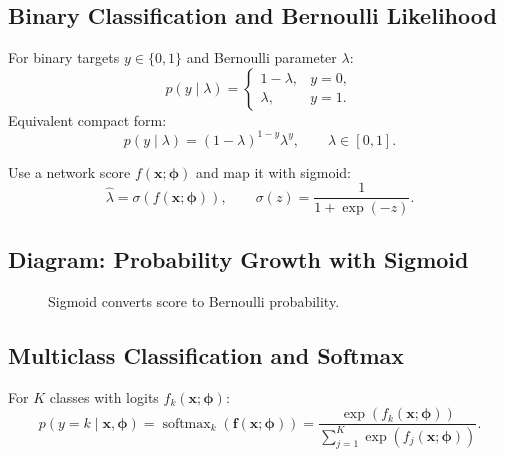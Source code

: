 \subsection{Binary Classification and Bernoulli Likelihood}
For binary targets $y\in\{0,1\}$ and Bernoulli parameter $\lambda$:
\[
p(y\mid \lambda)=
\begin{cases}
1-\lambda, & y=0,\\
\lambda, & y=1.
\end{cases}
\]
Equivalent compact form:
\[
p(y\mid\lambda)=(1-\lambda)^{1-y}\lambda^{y},
\qquad
\lambda\in[0,1].
\]

Use a network score $f(\mathbf{x};\boldsymbol{\phi})$ and map it with sigmoid:
\[
\hat{\lambda}=\sigma(f(\mathbf{x};\boldsymbol{\phi})),
\qquad
\sigma(z)=\frac{1}{1+\exp(-z)}.
\]

\subsection{Diagram: Probability Growth with Sigmoid}
\begin{figure}[h!]
\centering
{}
\caption{Sigmoid converts score to Bernoulli probability.}
\end{figure}

\subsection{Multiclass Classification and Softmax}
For $K$ classes with logits $f_k(\mathbf{x};\boldsymbol{\phi})$:
\[
p(y=k\mid \mathbf{x},\boldsymbol{\phi})
=
\operatorname{softmax}_k(\mathbf{f}(\mathbf{x};\boldsymbol{\phi}))
=
\frac{\exp(f_k(\mathbf{x};\boldsymbol{\phi}))}
{\sum_{j=1}^{K}\exp(f_j(\mathbf{x};\boldsymbol{\phi}))}.
\]

